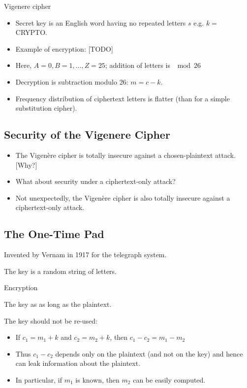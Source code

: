 \begin{Example}{Vigenere cipher}{}
      \begin{itemize}
            \item Secret key is an English word having no repeated letters $s$
                  e.g. $k=$ CRYPTO\@.
            \item Example of encryption:
                  [TODO]
            \item Here, $A=0, B=1, \ldots, Z=25$; addition of letters is $ \mod 26$
            \item Decryption is subtraction modulo 26: $m=c-k$.
            \item Frequency distribution of ciphertext letters is flatter
                  (than for a simple substitution cipher).
      \end{itemize}
\end{Example}

\subsection*{Security of the Vigenere Cipher}
\begin{itemize}
      \item The Vigenère cipher is totally insecure against a chosen-plaintext attack. [Why?]
      \item What about security under a ciphertext-only attack?
      \item Not unexpectedly, the Vigenère cipher is also totally insecure against
            a ciphertext-only attack.
\end{itemize}

\subsection*{The One-Time Pad}
Invented by Vernam in 1917 for the telegraph system.

The key is a random string of letters.

\begin{Example}{Encryption}{}
\end{Example}
\begin{Remark}{}{}
      The key as as long as the plaintext.
\end{Remark}

The key should not be re-used:
\begin{itemize}
      \item If $c_{1}=m_{1}+k$ and $c_{2}=m_{2}+k$, then $c_{1}-c_{2}=m_{1}-m_{2}$
      \item Thus $c_{1}-c_{2}$ depends only on the plaintext
            (and not on the key) and hence can leak information about the plaintext.
      \item In particular, if $m_{1}$ is known, then $m_{2}$ can be easily computed.
\end{itemize}

